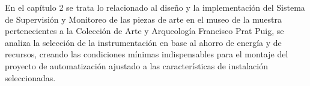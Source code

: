     En el capítulo 2 se trata lo relacionado al diseño y la implementación del Sistema de Supervisión y Monitoreo de las piezas de arte en el museo de la muestra pertenecientes a la Colección de Arte y Arqueología Francisco Prat Puig, se analiza la selección de la instrumentación en base al ahorro de energía y de recursos, creando las condiciones mínimas indispensables para el montaje del proyecto de automatización ajustado a las características de instalación seleccionadas.
    